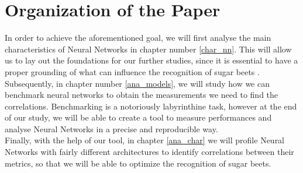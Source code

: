 \section{Organization of the Paper}
In order to achieve the aforementioned goal, we will first analyse the main characteristics of Neural Networks in chapter number \ref{char_nn}. This will allow us to lay out the foundations for our further studies, since it is essential to have a proper grounding of what can influence the recognition of sugar beets .\\
Subsequently, in chapter number \ref{ana_models}, we will study how we can benchmark neural networks to obtain the measurements we need to find the correlations. Benchmarking is a notoriously labyrinthine task, however at the end of our study, we will be able to create a tool to measure performances and analyse Neural Networks in a precise and reproducible way.\\
Finally, with the help of our tool, in chapter \ref{ana_char} we will profile Neural Networks with fairly different architectures to identify correlations between their metrics, so that we will be able to optimize the recognition of sugar beets. 
